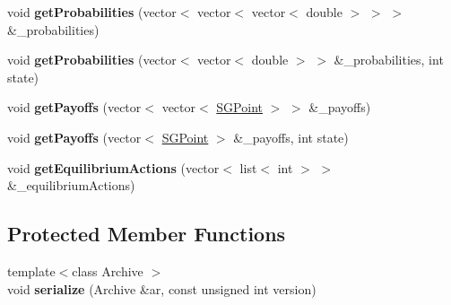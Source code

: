 \begin{DoxyCompactItemize}
\item 
\hypertarget{class_s_g_game_af809fc287dc8f7c13c03a73c9d6a42d9}{void {\bfseries get\+Probabilities} (vector$<$ vector$<$ vector$<$ double $>$ $>$ $>$ \&\+\_\+probabilities)}\label{class_s_g_game_af809fc287dc8f7c13c03a73c9d6a42d9}

\item 
\hypertarget{class_s_g_game_a559abdecb6fef1a13bdbc8e876a66e82}{void {\bfseries get\+Probabilities} (vector$<$ vector$<$ double $>$ $>$ \&\+\_\+probabilities, int state)}\label{class_s_g_game_a559abdecb6fef1a13bdbc8e876a66e82}

\item 
\hypertarget{class_s_g_game_a39ca71850bb7e51260d761fe84aa4501}{void {\bfseries get\+Payoffs} (vector$<$ vector$<$ \hyperlink{class_s_g_point}{S\+G\+Point} $>$ $>$ \&\+\_\+payoffs)}\label{class_s_g_game_a39ca71850bb7e51260d761fe84aa4501}

\item 
\hypertarget{class_s_g_game_ab12daf6b47ba1eb1086af0c013fd5988}{void {\bfseries get\+Payoffs} (vector$<$ \hyperlink{class_s_g_point}{S\+G\+Point} $>$ \&\+\_\+payoffs, int state)}\label{class_s_g_game_ab12daf6b47ba1eb1086af0c013fd5988}

\item 
\hypertarget{class_s_g_game_ad849d59f40ea5cbe15e3d2ef4fe8bb66}{void {\bfseries get\+Equilibrium\+Actions} (vector$<$ list$<$ int $>$ $>$ \&\+\_\+equilibrium\+Actions)}\label{class_s_g_game_ad849d59f40ea5cbe15e3d2ef4fe8bb66}

\end{DoxyCompactItemize}
\subsection*{Protected Member Functions}
\begin{DoxyCompactItemize}
\item 
\hypertarget{class_s_g_game_a383c8f7ec881befac40d6e45c7e1b775}{{\footnotesize template$<$class Archive $>$ }\\void {\bfseries serialize} (Archive \&ar, const unsigned int version)}\label{class_s_g_game_a383c8f7ec881befac40d6e45c7e1b775}

\end{DoxyCompactItemize}
